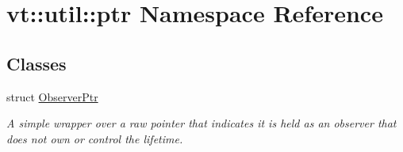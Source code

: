\hypertarget{namespacevt_1_1util_1_1ptr}{}\section{vt\+:\+:util\+:\+:ptr Namespace Reference}
\label{namespacevt_1_1util_1_1ptr}
\subsection*{Classes}
\begin{DoxyCompactItemize}
\item 
struct \hyperlink{structvt_1_1util_1_1ptr_1_1_observer_ptr}{Observer\+Ptr}
\begin{DoxyCompactList}\small\item\em A simple wrapper over a raw pointer that indicates it is held as an observer that does not own or control the lifetime. \end{DoxyCompactList}\end{DoxyCompactItemize}
